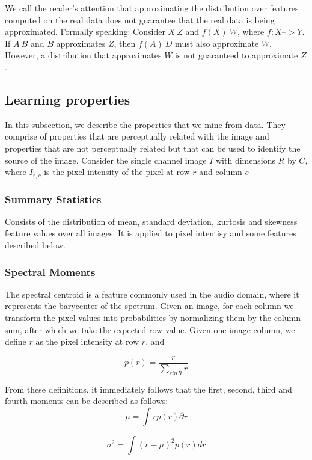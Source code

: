 We call the reader's attention that approximating the distribution over features
computed on the real data does not guarantee that the real data is being
approximated. Formally speaking:
Consider $X ~ Z$ and $f(X) ~ W$, where $f: X –> Y$.
If $A ~ B$ and $B$ approximates $Z$, then $f(A) ~ D$ must also approximate $W$.
However, a distribution that approximates $W$ is not guaranteed to approximate
$Z$.

\subsection{Learning properties}
In this subsection, we describe the properties that we mine from data. They
comprise of properties that are perceptually related with the image and
properties that are not perceptually related but that can be used to identify
the source of the image. Consider the single channel image $I$ with dimensions 
$R$ by $C$, where $I_{r, c}$ is the pixel intensity of the pixel at row $r$ and column $c$

\subsubsection{Summary Statistics}
Consists of the distribution of mean, standard
deviation, kurtosis and skewness feature values over all images. It is applied
to pixel intentisy and some features described below.

\subsubsection{Spectral Moments}
The spectral centroid is a feature commonly used in the audio domain, where it
represents the barycenter of the spetrum. Given an image, for each column we transform the
pixel values into probabilities by normalizing them by the column sum, after which we
take the expected row value. Given one image column, we define $r$ as the pixel
intensity at row $r$, and 

\begin{equation}
    p(r) = \frac{r}{\sum_{r in R}r}
\end{equation}

From these definitions, it immediately follows that the first, second, third and fourth moments
can be described as follows: 
\begin{equation}
    \mu = \int rp(r) \partial r
\end{equation}

\begin{equation}
    \sigma^2 = \int (r - \mu)^2 p(r) dr
\end{equation}

